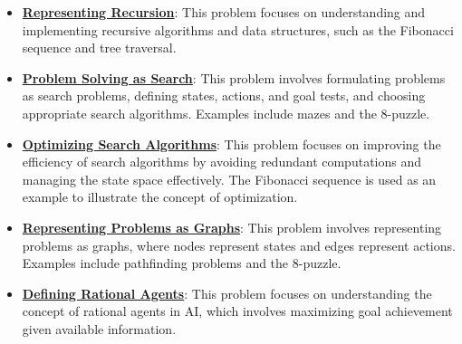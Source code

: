 \documentclass{article}%
\begin{document}
\begin{itemize}[leftmargin=*]%
\item \href{https://purdue.brightspace.com/d2l/common/assets/pdfjs-d2l-dist/1.0.14-legacy/web/viewer.html?file=\%2Fcontent\%2Fenforced\%2F1095467-wl.202510.CS.24300.001\%2F14L1-DepthFS.pdf\%3Fou\%3D1095467\&lang=en-us\&container=d2l-fileviewer-rendered-pdf\&fullscreen=d2l-fileviewer-rendered-pdf-dialog\&height=667#page=3}{\textbf{Representing Recursion}}: This problem focuses on understanding and implementing recursive algorithms and data structures, such as the Fibonacci sequence and tree traversal.%
\item \href{https://purdue.brightspace.com/d2l/common/assets/pdfjs-d2l-dist/1.0.14-legacy/web/viewer.html?file=\%2Fcontent\%2Fenforced\%2F1095467-wl.202510.CS.24300.001\%2F14L1-DepthFS.pdf\%3Fou\%3D1095467\&lang=en-us\&container=d2l-fileviewer-rendered-pdf\&fullscreen=d2l-fileviewer-rendered-pdf-dialog\&height=667#page=14}{\textbf{Problem Solving as Search}}: This problem involves formulating problems as search problems, defining states, actions, and goal tests, and choosing appropriate search algorithms. Examples include mazes and the 8-puzzle.%
\item \href{https://purdue.brightspace.com/d2l/common/assets/pdfjs-d2l-dist/1.0.14-legacy/web/viewer.html?file=\%2Fcontent\%2Fenforced\%2F1095467-wl.202510.CS.24300.001\%2F14L1-DepthFS.pdf\%3Fou\%3D1095467\&lang=en-us\&container=d2l-fileviewer-rendered-pdf\&fullscreen=d2l-fileviewer-rendered-pdf-dialog\&height=667#page=21}{\textbf{Optimizing Search Algorithms}}: This problem focuses on improving the efficiency of search algorithms by avoiding redundant computations and managing the state space effectively. The Fibonacci sequence is used as an example to illustrate the concept of optimization.%
\item \href{https://purdue.brightspace.com/d2l/common/assets/pdfjs-d2l-dist/1.0.14-legacy/web/viewer.html?file=\%2Fcontent\%2Fenforced\%2F1095467-wl.202510.CS.24300.001\%2F14L1-DepthFS.pdf\%3Fou\%3D1095467\&lang=en-us\&container=d2l-fileviewer-rendered-pdf\&fullscreen=d2l-fileviewer-rendered-pdf-dialog\&height=667#page=25}{\textbf{Representing Problems as Graphs}}: This problem involves representing problems as graphs, where nodes represent states and edges represent actions. Examples include pathfinding problems and the 8-puzzle.%
\item \href{https://purdue.brightspace.com/d2l/common/assets/pdfjs-d2l-dist/1.0.14-legacy/web/viewer.html?file=\%2Fcontent\%2Fenforced\%2F1095467-wl.202510.CS.24300.001\%2F14L1-DepthFS.pdf\%3Fou\%3D1095467\&lang=en-us\&container=d2l-fileviewer-rendered-pdf\&fullscreen=d2l-fileviewer-rendered-pdf-dialog\&height=667#page=39}{\textbf{Defining Rational Agents}}: This problem focuses on understanding the concept of rational agents in AI, which involves maximizing goal achievement given available information.%
\end{itemize}%
\end{document}
